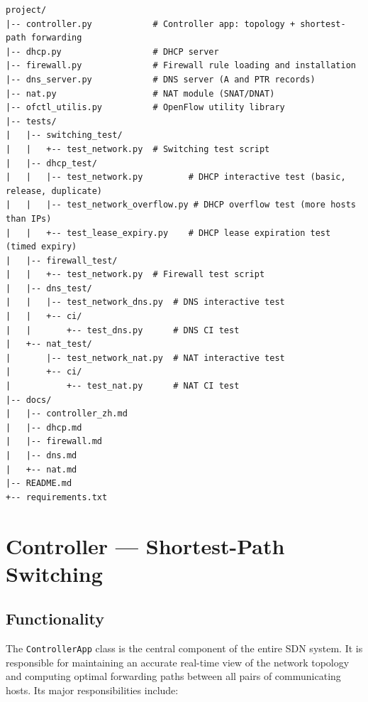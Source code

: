 \documentclass[12pt,a4paper]{article}
\begin{document}
\begin{lstlisting}[style=textstyle]
project/
|-- controller.py            # Controller app: topology + shortest-path forwarding
|-- dhcp.py                  # DHCP server
|-- firewall.py              # Firewall rule loading and installation
|-- dns_server.py            # DNS server (A and PTR records)
|-- nat.py                   # NAT module (SNAT/DNAT)
|-- ofctl_utilis.py          # OpenFlow utility library
|-- tests/
|   |-- switching_test/
|   |   +-- test_network.py  # Switching test script
|   |-- dhcp_test/
|   |   |-- test_network.py         # DHCP interactive test (basic, release, duplicate)
|   |   |-- test_network_overflow.py # DHCP overflow test (more hosts than IPs)
|   |   +-- test_lease_expiry.py    # DHCP lease expiration test (timed expiry)
|   |-- firewall_test/
|   |   +-- test_network.py  # Firewall test script
|   |-- dns_test/
|   |   |-- test_network_dns.py  # DNS interactive test
|   |   +-- ci/
|   |       +-- test_dns.py      # DNS CI test
|   +-- nat_test/
|       |-- test_network_nat.py  # NAT interactive test
|       +-- ci/
|           +-- test_nat.py      # NAT CI test
|-- docs/
|   |-- controller_zh.md
|   |-- dhcp.md
|   |-- firewall.md
|   |-- dns.md
|   +-- nat.md
|-- README.md
+-- requirements.txt
\end{lstlisting}

\section{Controller --- Shortest-Path Switching}

\subsection{Functionality}

The \texttt{ControllerApp} class is the central component of the entire SDN system. It is responsible for maintaining an accurate real-time view of the network topology and computing optimal forwarding paths between all pairs of communicating hosts. Its major responsibilities include:
\end{document}
